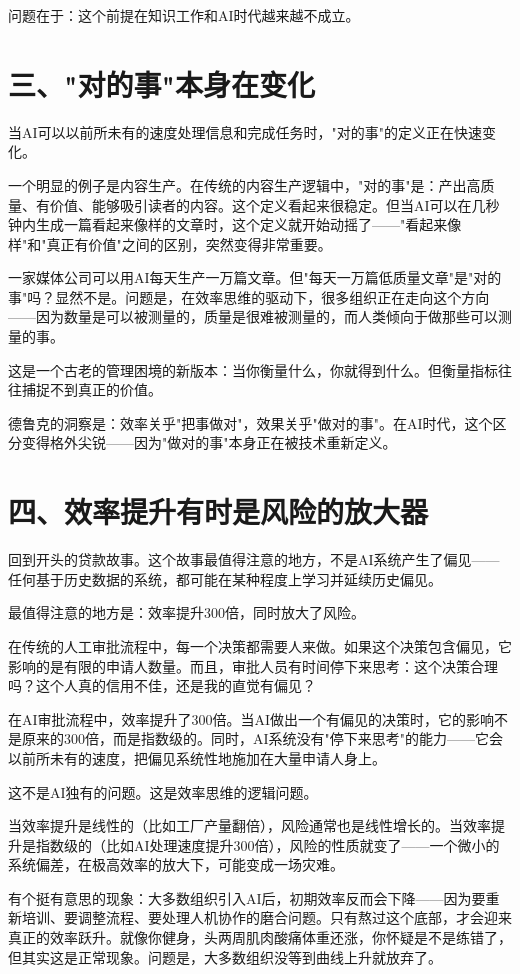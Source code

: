 问题在于：这个前提在知识工作和AI时代越来越不成立。


\section{三、"对的事"本身在变化}


当AI可以以前所未有的速度处理信息和完成任务时，"对的事"的定义正在快速变化。

一个明显的例子是内容生产。在传统的内容生产逻辑中，"对的事"是：产出高质量、有价值、能够吸引读者的内容。这个定义看起来很稳定。但当AI可以在几秒钟内生成一篇看起来像样的文章时，这个定义就开始动摇了——"看起来像样"和"真正有价值"之间的区别，突然变得非常重要。

一家媒体公司可以用AI每天生产一万篇文章。但"每天一万篇低质量文章"是"对的事"吗？显然不是。问题是，在效率思维的驱动下，很多组织正在走向这个方向——因为数量是可以被测量的，质量是很难被测量的，而人类倾向于做那些可以测量的事。

这是一个古老的管理困境的新版本：当你衡量什么，你就得到什么。但衡量指标往往捕捉不到真正的价值。

德鲁克的洞察是：效率关乎"把事做对"，效果关乎"做对的事"。在AI时代，这个区分变得格外尖锐——因为"做对的事"本身正在被技术重新定义。


\section{四、效率提升有时是风险的放大器}


回到开头的贷款故事。这个故事最值得注意的地方，不是AI系统产生了偏见——任何基于历史数据的系统，都可能在某种程度上学习并延续历史偏见。

最值得注意的地方是：效率提升300倍，同时放大了风险。

在传统的人工审批流程中，每一个决策都需要人来做。如果这个决策包含偏见，它影响的是有限的申请人数量。而且，审批人员有时间停下来思考：这个决策合理吗？这个人真的信用不佳，还是我的直觉有偏见？

在AI审批流程中，效率提升了300倍。当AI做出一个有偏见的决策时，它的影响不是原来的300倍，而是指数级的。同时，AI系统没有"停下来思考"的能力——它会以前所未有的速度，把偏见系统性地施加在大量申请人身上。

这不是AI独有的问题。这是效率思维的逻辑问题。

当效率提升是线性的（比如工厂产量翻倍），风险通常也是线性增长的。当效率提升是指数级的（比如AI处理速度提升300倍），风险的性质就变了——一个微小的系统偏差，在极高效率的放大下，可能变成一场灾难。

有个挺有意思的现象：大多数组织引入AI后，初期效率反而会下降——因为要重新培训、要调整流程、要处理人机协作的磨合问题。只有熬过这个底部，才会迎来真正的效率跃升。就像你健身，头两周肌肉酸痛体重还涨，你怀疑是不是练错了，但其实这是正常现象。问题是，大多数组织没等到曲线上升就放弃了。

